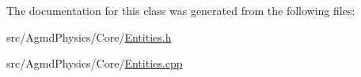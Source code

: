 The documentation for this class was generated from the following files\+:\begin{DoxyCompactItemize}
\item 
src/\+Agmd\+Physics/\+Core/\hyperlink{_agmd_physics_2_core_2_entities_8h}{Entities.\+h}\item 
src/\+Agmd\+Physics/\+Core/\hyperlink{_agmd_physics_2_core_2_entities_8cpp}{Entities.\+cpp}\end{DoxyCompactItemize}
